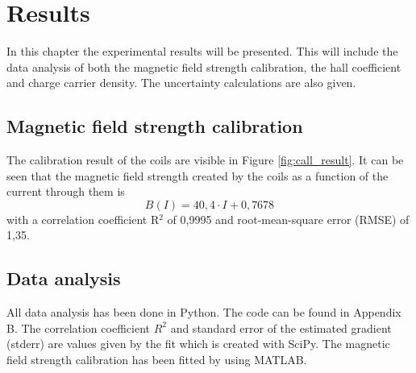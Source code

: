\chapter{Results}
In this chapter the experimental results will be presented. This will include the data analysis of both the magnetic field strength calibration, the hall coefficient and charge carrier density. The uncertainty calculations are also given.

\section{Magnetic field strength calibration}
The calibration result of the coils are visible in Figure \ref{fig:call_result}. It can be seen that the magnetic field strength created by the coils as a function of the current through them is
    \begin{equation}
        B(I) = 40,4 \cdot I + 0,7678 \label{eq:call}
    \end{equation}
with a correlation coefficient R$^2$ of 0,9995 and root-mean-square error (RMSE) of 1,35.

\section{Data analysis}
All data analysis has been done in Python. The code can be found in Appendix B. The correlation coefficient $R^2$ and standard error of the estimated gradient (stderr) are values given by the fit which is created with SciPy. The magnetic field strength calibration has been fitted by using MATLAB. 

